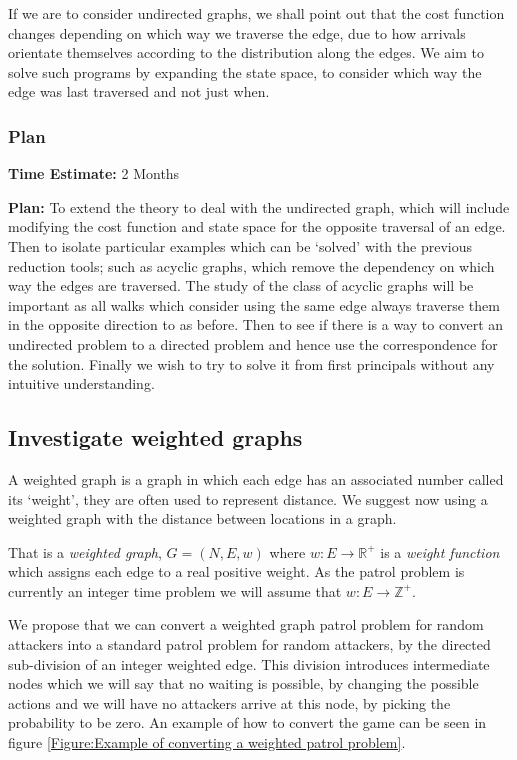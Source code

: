 \documentclass[a4paper,10pt]{article}
\theoremstyle{definition}
\theoremstyle{definition}
\theoremstyle{remark}
\theoremstyle{definition}
\begin{document}
If we are to consider undirected graphs, we shall point out that the cost function changes depending on which way we traverse the edge, due to how arrivals orientate themselves according to the distribution along the edges. We aim to solve such programs by expanding the state space, to consider which way the edge was last traversed and not just when.

\subsubsection{Plan}
\textbf{Time Estimate:} 2 Months

\textbf{Plan:} To extend the theory to deal with the undirected graph, which  will include modifying the cost function and state space for the opposite traversal of an edge. Then to isolate particular examples which can be `solved' with the previous reduction tools; such as acyclic graphs, which remove the dependency on which way the edges are traversed. The study of the class of  acyclic graphs will be important as all walks which consider using the same edge always traverse them in the opposite direction to as before. Then to see if there is a way to convert an undirected problem to a directed problem and hence use the correspondence for the solution. Finally we wish to try to solve it from first principals without any intuitive understanding.


\subsection{Investigate weighted graphs}
A weighted graph is a graph in which each edge has an associated number called its `weight', they are often used to represent distance. We suggest now using a weighted graph with the distance between locations in a graph.

That is a \textit{weighted graph}, $G=(N,E,w)$ where $w: E \rightarrow \mathbb{R}^{+}$ is a \textit{weight function} which assigns each edge to a real positive weight. As the patrol problem is currently an integer time problem we will assume that $w: E \rightarrow \mathbb{Z}^{+}$.

We propose that we can convert a weighted graph patrol problem for random attackers into a standard patrol problem for random attackers, by the directed sub-division of an integer weighted edge. This division introduces intermediate nodes which we will say that no waiting is possible, by changing the possible actions and we will have no attackers arrive at this node, by picking the probability to be zero. An example of how to convert the game can be seen in figure \ref{Figure:Example of converting a weighted patrol problem}.
\end{document}
